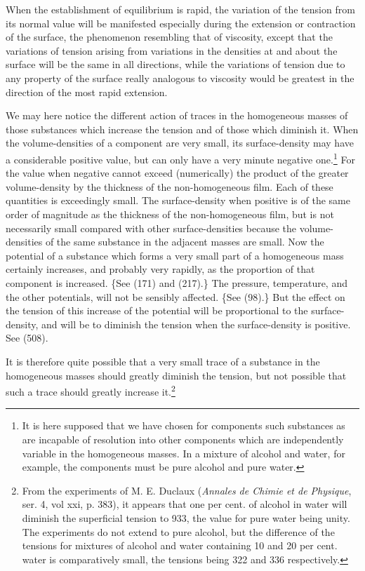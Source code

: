 \documentclass[12pt]{memoir}
\begin{document}
{When the establishment of equilibrium is rapid, the variation of the tension from its normal value will be manifested especially during the extension or contraction of the surface, the phenomenon resembling that of viscosity, except that the variations of tension arising from variations in the densities at and about the surface will be the same in all directions, while the variations of tension due to any property of the surface really analogous to viscosity would be greatest in the direction of the most rapid extension.

We may here notice the different action of traces in the homogeneous masses of those substances which increase the tension and of those which diminish it. When the volume-densities of a component are very small, its surface-density may have a considerable positive value, but can only have a very minute negative one.\footnote{It is here supposed that we have chosen for components such substances as are incapable of resolution into other components which are independently variable in the homogeneous masses. In a mixture of alcohol and water, for example, the components must be pure alcohol and pure water.} For the value when negative cannot exceed (numerically) the product of the greater volume-density by the thickness of the non-homogeneous film. Each of these quantities is exceedingly small. The surface-density when positive is of the same order of magnitude as the thickness of the non-homogeneous film, but is not necessarily small compared with other surface-densities because the volume-densities of the same substance in the adjacent masses are small. Now the potential of a substance which forms a very small part of a homogeneous mass certainly increases, and probably very rapidly, as the proportion of that component is increased. \{See (171) and (217).\} The pressure, temperature, and the other potentials, will not be sensibly affected.  \{See (98).\}  But the effect on the tension of this increase of the potential will be proportional to the surface-density, and will be to diminish the tension when the surface-density is positive. See (508).} It is therefore quite possible that a very small trace of a substance in the homogeneous masses should greatly diminish the tension, but not possible that such a trace should greatly increase it.\footnote{From the experiments of M. E. Duclaux (\textit{Annales de Chimie et de Physique}, ser. 4, vol xxi, p. 383), it appears that one per cent. of alcohol in water will diminish the superficial tension to 933, the value for pure water being unity. The experiments do not extend to pure alcohol, but the difference of the tensions for mixtures of alcohol and water containing 10 and 20 per cent. water is comparatively small, the tensions being 322 and 336 respectively.\par
}
\end{document}
